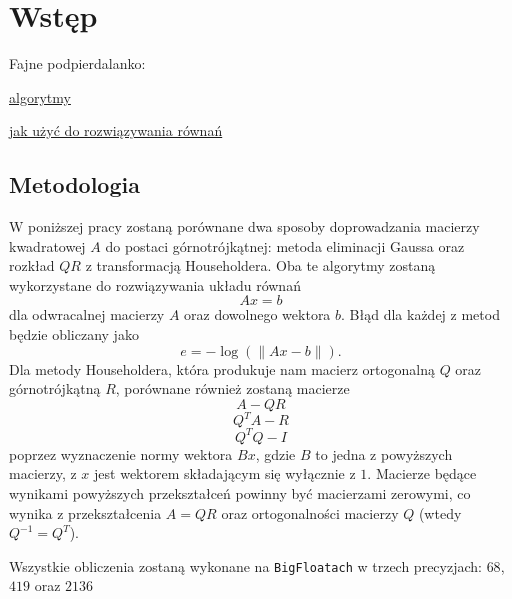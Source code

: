 \section{Wstęp}

Fajne podpierdalanko:

\href{https://people.inf.ethz.ch/gander/papers/qrneu.pdf}{algorytmy}

\href{https://inst.eecs.berkeley.edu/~ee127/sp21/livebook/l_lineqs_solving.html}{jak użyć do rozwiązywania równań}

\subsection{Metodologia}

W poniższej pracy zostaną porównane dwa sposoby doprowadzania macierzy kwadratowej $A$ do postaci górnotrójkątnej: metoda eliminacji Gaussa oraz rozkład $QR$ z transformacją Householdera. Oba te algorytmy zostaną wykorzystane do rozwiązywania układu równań 
$$Ax=b$$
dla odwracalnej macierzy $A$ oraz dowolnego wektora $b$. Błąd dla każdej z metod będzie obliczany jako
$$e=-\log(\|Ax-b\|).$$
Dla metody Householdera, która produkuje nam macierz ortogonalną $Q$ oraz górnotrójkątną $R$, porównane również zostaną macierze
$$A-QR$$
$$Q^TA-R$$
$$Q^TQ-I$$
poprzez wyznaczenie normy wektora $Bx$, gdzie $B$ to jedna z powyższych macierzy, z $x$ jest wektorem składającym się wyłącznie z $1$. Macierze będące wynikami powyższych przekształceń powinny być macierzami zerowymi, co wynika z przekształcenia $A=QR$ oraz ortogonalności macierzy $Q$ (wtedy $Q^{-1}=Q^T$).

Wszystkie obliczenia zostaną wykonane na \verb+BigFloatach+ w trzech precyzjach: $68$, $419$ oraz $2136$